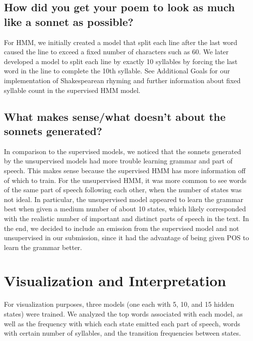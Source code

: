 \subsection{How did you get your poem to look as much like a sonnet as possible?}
For HMM, we initially created a model that split each line after the last word caused the line to exceed a fixed number of characters such as 60. We later developed a model to split each line by exactly 10 syllables by forcing the last word in the line to complete the 10th syllable. See Additional Goals for our implementation of Shakespearean rhyming and further information about fixed syllable count in the supervised HMM model.
\subsection{What makes sense/what doesn't about the sonnets generated?}
In comparison to the supervised models, we noticed that the sonnets generated by the unsupervised models had more trouble learning grammar and part of speech. This makes sense because the supervised HMM has more information off of which to train. For the unsupervised HMM, it was more common to see words of the same part of speech following each other, when the number of states was not ideal. In particular, the unsupervised model appeared to learn the grammar best when given a medium number of about 10 states, which likely corresponded with the realistic number of important and distinct parts of speech in the text. In the end, we decided to include an emission from the supervised model and not unsupervised in our submission, since it had the advantage of being given POS to learn the grammar better.

\section{Visualization and Interpretation}
For visualization purposes, three models (one each with 5, 10, and 15 hidden states) were trained. We analyzed the top words associated with each model, as well as the frequency with which each state emitted each part of speech, words with certain number of syllables, and the transition frequencies between states.

\medskip

